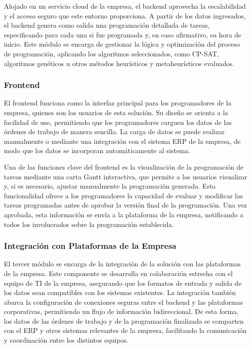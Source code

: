 \documentclass{article}
\begin{document}
Alojado en un servicio cloud de la empresa, el backend aprovecha la escalabilidad y el acceso seguro que este entorno proporciona. A partir de los datos ingresados, el backend genera como salida una programación detallada de tareas, especificando para cada una si fue programada y, en caso afirmativo, su hora de inicio. Este módulo se encarga de gestionar la lógica y optimización del proceso de programación, aplicando los algoritmos seleccionados, como CP-SAT, algoritmos genéticos u otros métodos heurísticos y metaheurísticos evaluados.

\subsubsection{Frontend}

El frontend funciona como la interfaz principal para los programadores de la empresa, quienes son los usuarios de esta solución. Su diseño se orienta a la facilidad de uso, permitiendo que los programadores carguen los datos de las órdenes de trabajo de manera sencilla. La carga de datos se puede realizar manualmente o mediante una integración con el sistema ERP de la empresa, de modo que los datos se incorporan automáticamente al sistema.

Una de las funciones clave del frontend es la visualización de la programación de tareas mediante una carta Gantt interactiva, que permite a los usuarios visualizar y, si es necesario, ajustar manualmente la programación generada. Esta funcionalidad ofrece a los programadores la capacidad de evaluar y modificar las tareas programadas antes de aprobar la versión final de la programación. Una vez aprobada, esta información se envía a la plataforma de la empresa, notificando a todos los involucrados sobre la programación establecida.

\subsubsection{Integración con Plataformas de la Empresa}

El tercer módulo se encarga de la integración de la solución con las plataformas de la empresa. Este componente se desarrolla en colaboración estrecha con el equipo de TI de la empresa, asegurando que los formatos de entrada y salida de los datos sean compatibles con los sistemas existentes. La integración también abarca la configuración de conexiones seguras entre el backend y las plataformas corporativas, permitiendo un flujo de información bidireccional. De esta forma, los datos de las órdenes de trabajo y de la programación finalizada se comparten con el ERP y otros sistemas relevantes de la empresa, facilitando la comunicación y coordinación entre los distintos equipos.
\end{document}
